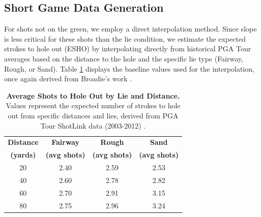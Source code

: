 \documentclass[11pt, letterpaper]{article}
\begin{document}
\subsection{Short Game Data Generation}
\label{app: short-game data}

For shots not on the green, we employ a direct interpolation method. Since slope is less critical for these shots than the lie condition, we estimate the expected strokes to hole out (ESHO) by interpolating directly from historical PGA Tour averages based on the distance to the hole and the specific lie type (Fairway, Rough, or Sand). Table \ref{tab:broadie_shortgame} displays the baseline values used for the interpolation, once again derived from Broadie's work \parencite{Broadie_2014a}.

\begin{table}[h!]
    \centering
    \scriptsize
    \caption{\textbf{Average Shots to Hole Out by Lie and Distance.} Values represent the expected number of strokes to hole out from specific distances and lies, derived from PGA Tour ShotLink data (2003-2012) \parencite{Broadie_2014a}.}
    \label{tab:broadie_shortgame}
    \renewcommand{\arraystretch}{1.2}
    \begin{tabular}{cccc}
        \toprule
        \textbf{Distance} & \textbf{Fairway} & \textbf{Rough} & \textbf{Sand} \\
        \textbf{(yards)} & \textbf{(avg shots)} & \textbf{(avg shots)} & \textbf{(avg shots)} \\
        \midrule
        20 & 2.40 & 2.59 & 2.53 \\
        40 & 2.60 & 2.78 & 2.82 \\
        60 & 2.70 & 2.91 & 3.15 \\
        80 & 2.75 & 2.96 & 3.24 \\
        \bottomrule
    \end{tabular}
\end{table}
\end{document}
